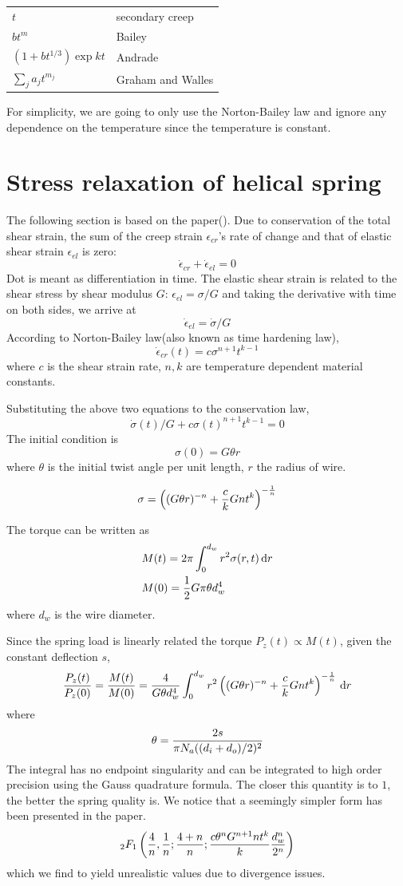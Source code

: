 \documentclass[10pt]{article}
\begin{document}
\begin{tabular}{ll}
$t$ & secondary creep \\
$bt^m$ & Bailey \\
$(1+bt^{1/3})\exp{kt}$ & Andrade\\
$\sum_j a_j t^{m_j}$ & Graham and Walles
\end{tabular}

For simplicity, we are going to only use the Norton-Bailey law and ignore any dependence on the temperature since the temperature is constant.
\section{Stress relaxation of helical spring}
The following section is based on the paper(\cite{Relaxation1}). Due to conservation of the total shear strain, the sum of the creep strain $\epsilon_{cr}$'s rate of change and that of elastic shear strain $\epsilon_{el}$ is zero:
\[
\dot{\epsilon}_{cr} + \dot{\epsilon}_{el} = 0
\]
Dot is meant as differentiation in time. The elastic shear strain is related to the shear stress by shear modulus $G$: $\epsilon_{el} = \sigma/G$ and taking the derivative with time on both sides, we arrive at
\[
\dot{\epsilon}_{el} = \dot{\sigma}/G
\]
According to Norton-Bailey law(also known as time hardening law),
\begin{equation} \label{eq:N-B}
\dot{\epsilon}_{cr}(t)=c\sigma^{n+1} t^{k-1}
\end{equation}
where $c$ is the shear strain rate, $n,k$ are temperature dependent material constants.

Substituting the above two equations to the conservation law,
\begin{equation} \label{eq:diff}
\dot{\sigma}(t)/G+c\sigma(t)^{n+1} t^{k-1}=0
\end{equation}
The initial condition is
\[
\sigma (0) = G\theta r
\]
where $\theta$ is the initial twist angle per unit length, $r$ the radius of wire.

\[
\sigma = \left( (G\theta r)^{-n} + {c\over k} Gnt^k \right)^{-{1\over n}}
\]

The torque can be written as
\begin{align*}
&M(t) = 2\pi \int_0^{d_w} r^2 \sigma(r,t)\,\mathrm{d} r\\
&M(0)={1\over 2} G\pi\theta d_w^4
\end{align*}
where $d_w$ is the wire diameter.

Since the spring load is linearly related the torque $P_z(t)\propto M(t)$, given the constant deflection $s$,
\[
{P_z(t)\over P_z(0)} = {M(t)\over M(0)} = {4\over G\theta d_w^4}\int_0^{d_w} r^2 \left( (G\theta r)^{-n} + {c\over k} Gnt^k \right)^{-{1\over n}} \,\mathrm{d} r
\]
where
\[
\theta = {2s\over \pi N_a ((d_i+d_o)/2)^2}
\]
The integral has no endpoint singularity and can be integrated to high order precision using the Gauss quadrature formula. The closer this quantity is to $1$, the better the spring quality is. We notice that a seemingly simpler form has been presented in the paper.
\[
{}_{2}F_1 \left( {4\over n},{1\over n};{4+n\over n};{c\theta^n G^{n+1} n t^k\over k} {d_w^n\over 2^n}\right)
\]
which we find to yield unrealistic values due to divergence issues.
\end{document}
